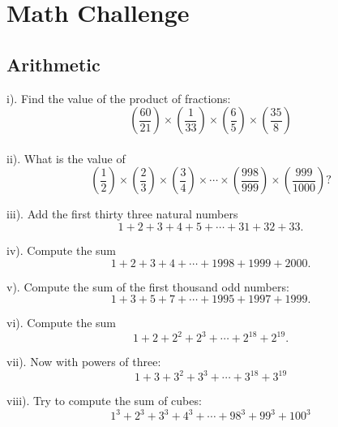 \chapter*{Math Challenge}

\section*{Arithmetic}

i). Find the value of the product of fractions: $$\left(\frac{60}{21}\right)\times\left(\frac{1}{33}\right)\times\left(\frac{6}{5}\right)\times \left(\frac{35}{8}\right)$$\\


ii). What is the value of $$\left(\frac{1}{2}\right)\times\left(\frac{2}{3}\right)\times\left(\frac{3}{4}\right)\times\cdots \times\left(\frac{998}{999}\right)\times\left( \frac{999}{1000}\right)?$$

iii). Add the first thirty three natural numbers $$1+2+3+4+5+\cdots+31+32 +33.$$

iv). Compute the sum $$1+2+3+4+\cdots +1998+1999+2000.$$


v). Compute the sum of the first thousand odd numbers: $$1+3+5+7+\cdots +1995+1997+1999.$$


vi). Compute the sum $$1+2+2^2+2^3+\cdots +2^{18}+2^{19}.$$


vii). Now with powers of three: $$1+3+3^2+3^3+\cdots +3^{18}+3^{19}$$


viii). Try to compute the sum of cubes: $$1^3+2^3+3^3+4^3+\cdots +98^3+99^3+100^3$$

